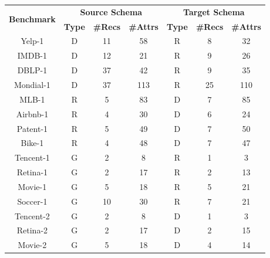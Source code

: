 \documentclass[]{article}
\begin{document}
                \begin{table}
                    \centering
                    \small
                    \begin{tabular}{|c|c|c|c|c|c|c|}
                    \hline
                    \multirow{2}{*}{\textbf{\!\!Benchmark\!\!}} &
                    \multicolumn{3}{c|}{\textbf{Source Schema}} &
                    \multicolumn{3}{c|}{\textbf{Target Schema}} \\
                    \cline{2-7}
                    & \textbf{\!\!Type\!\!} & \textbf{\!\!\#Recs\!\!} & \textbf{\!\!\#Attrs\!\!} & \textbf{\!\!Type\!\!} & \textbf{\!\!\#Recs\!\!} & \textbf{\!\!\#Attrs\!\!} \\
                    \hline
                    Yelp-1 & D & 11 & 58 & R & 8 & 32 \\
                    \hline
                    IMDB-1 & D & 12 & 21 & R & 9 & 26 \\
                    \hline
                    DBLP-1 & D & 37 & 42 & R & 9 & 35 \\
                    \hline
                    Mondial-1 & D & 37 & 113 & R & 25 & 110 \\
                    \hline
                    MLB-1 & R & 5 & 83 & D & 7 & 85 \\
                    \hline
                    Airbnb-1 & R & 4 & 30 & D & 6 & 24 \\
                    \hline
                    Patent-1 & R & 5 & 49 & D & 7 & 50 \\
                    \hline
                    Bike-1 & R & 4 & 48 & D & 7 & 47 \\
                    \hline
                    Tencent-1 & G & 2 & 8 & R & 1 & 3 \\
                    \hline
                    Retina-1 & G & 2 & 17 & R & 2 & 13 \\
                    \hline
                    Movie-1 & G & 5 & 18 & R & 5 & 21 \\
                    \hline
                    Soccer-1 & G & 10 & 30 & R & 7 & 21 \\
                    \hline
                    Tencent-2 & G & 2 & 8 & D & 1 & 3 \\
                    \hline
                    Retina-2 & G & 2 & 17 & D & 2 & 15 \\
                    \hline
                    Movie-2 & G & 5 & 18 & D & 4 & 14 \\

\end{tabular}
\end{table}
\end{document}
